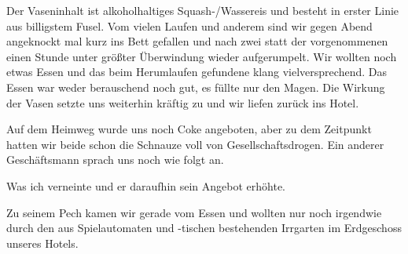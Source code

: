 \newpage


Der Vaseninhalt ist alkoholhaltiges Squash-/Wassereis und besteht in erster Linie aus billigstem Fusel.
Vom vielen Laufen und anderem sind wir gegen Abend angeknockt mal kurz ins Bett gefallen und nach zwei statt der vorgenommenen einen Stunde unter größter Überwindung wieder aufgerumpelt.
Wir wollten noch etwas Essen und das beim Herumlaufen gefundene  klang vielversprechend.
Das Essen war weder berauschend noch gut, es füllte nur den Magen.
Die Wirkung der Vasen setzte uns weiterhin kräftig zu und wir liefen zurück ins Hotel.

Auf dem Heimweg wurde uns noch Coke angeboten, aber zu dem Zeitpunkt hatten wir beide schon die Schnauze voll von Gesellschaftsdrogen.
Ein anderer Geschäftsmann sprach uns noch wie folgt an.
\begin{quote}
\end{quote}
Was ich verneinte und er daraufhin sein Angebot erhöhte.
\begin{quote}
\end{quote}
Zu seinem Pech kamen wir gerade vom Essen und wollten nur noch irgendwie durch den aus Spielautomaten und -tischen bestehenden Irrgarten im Erdgeschoss unseres Hotels.
